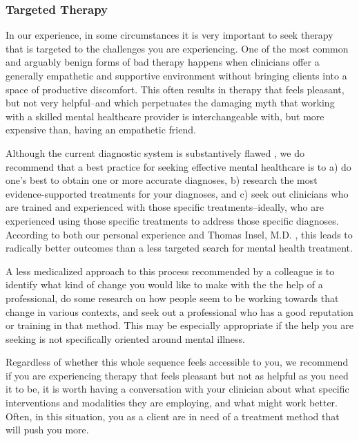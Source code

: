 \documentclass[12pt,letterpaper]{book}
\begin{document}
\subsubsection*{Targeted Therapy}
In our experience, in some circumstances it is very important to seek therapy that is targeted to the challenges you are experiencing. One of the most common and arguably benign forms of bad therapy happens when clinicians offer a generally empathetic and supportive environment without bringing clients into a space of productive discomfort. This often results in therapy that feels pleasant, but not very helpful–and which perpetuates the damaging myth that working with a skilled mental healthcare provider is interchangeable with, but more expensive than, having an empathetic friend.

Although the current diagnostic system is substantively flawed \cite{cohen2023need,eaton2023review}, we do recommend that a best practice for seeking effective mental healthcare is to a) do one's best to obtain one or more accurate diagnoses, b) research the most evidence-supported treatments for your diagnoses, and c) seek out clinicians who are trained and experienced with those specific treatments–ideally, who are experienced using those specific treatments to address those specific diagnoses. According to both our personal experience and Thomas Insel, M.D. \cite{eksIncel}, this leads to radically better outcomes than a less targeted search for mental health treatment.

A less medicalized approach to this process recommended by a colleague \cite{sinback} is to identify what kind of change you would like to make with the the help of a professional, do some research on how people seem to be working towards that change in various contexts, and seek out a professional who has a good reputation or training in that method. This may be especially appropriate if the help you are seeking is not specifically oriented around mental illness.

Regardless of whether this whole sequence feels accessible to you, we recommend if you are experiencing therapy that feels pleasant but not as helpful as you need it to be, it is worth having a conversation with your clinician about what specific interventions and modalities they are employing, and what might work better. Often, in this situation, you as a client are in need of a treatment method that will push you more.
\end{document}
